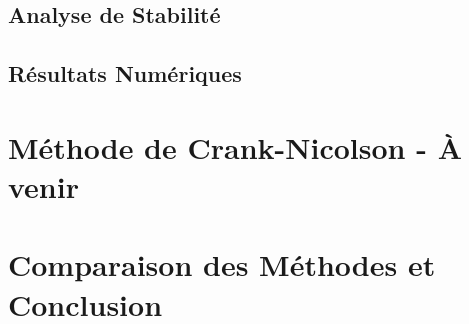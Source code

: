 \documentclass[11pt,a4paper]{article}
\begin{document}
\subsection{Analyse de Stabilité}

\subsection{Résultats Numériques}


\newpage
\section{Méthode de Crank-Nicolson - À venir}


\newpage
\section{Comparaison des Méthodes et Conclusion}
\end{document}
